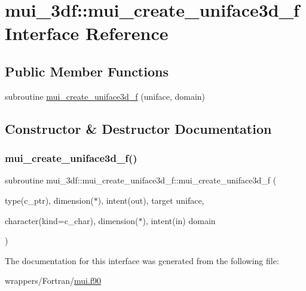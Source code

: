 \hypertarget{interfacemui__3df_1_1mui__create__uniface3d__f}{}\section{mui\+\_\+3df\+:\+:mui\+\_\+create\+\_\+uniface3d\+\_\+f Interface Reference}
\label{interfacemui__3df_1_1mui__create__uniface3d__f}
\subsection*{Public Member Functions}
\begin{DoxyCompactItemize}
\item 
subroutine \hyperlink{interfacemui__3df_1_1mui__create__uniface3d__f_aa0c154e8d0947c39931728b21eecf7d3}{mui\+\_\+create\+\_\+uniface3d\+\_\+f} (uniface, domain)
\end{DoxyCompactItemize}


\subsection{Constructor \& Destructor Documentation}
\mbox{\label{interfacemui__3df_1_1mui__create__uniface3d__f_aa0c154e8d0947c39931728b21eecf7d3}} 
\subsubsection{\texorpdfstring{mui\+\_\+create\+\_\+uniface3d\+\_\+f()}{mui\_create\_uniface3d\_f()}}
{\footnotesize\ttfamily subroutine mui\+\_\+3df\+::mui\+\_\+create\+\_\+uniface3d\+\_\+f\+::mui\+\_\+create\+\_\+uniface3d\+\_\+f (\begin{DoxyParamCaption}\item[{type(c\+\_\+ptr), dimension($\ast$), intent(out), target}]{uniface,  }\item[{character(kind=c\+\_\+char), dimension($\ast$), intent(in)}]{domain }\end{DoxyParamCaption})}



The documentation for this interface was generated from the following file\+:\begin{DoxyCompactItemize}
\item 
wrappers/\+Fortran/\hyperlink{mui_8f90}{mui.\+f90}\end{DoxyCompactItemize}
